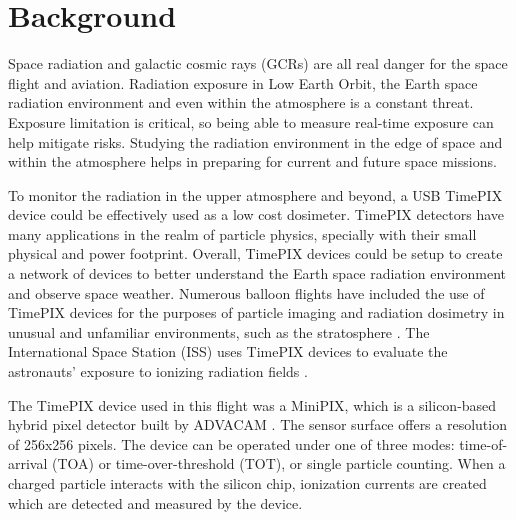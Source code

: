 %
%
%
\section{Background}
\label{Background}
Space radiation and galactic cosmic rays (GCRs) are all real danger for the space flight and aviation.  Radiation exposure in Low Earth Orbit, the Earth space radiation environment and even within the atmosphere is a constant threat. Exposure limitation is critical, so being able to measure real-time exposure can help mitigate risks.  Studying the radiation environment in the edge of space and within the atmosphere helps in preparing for current and future space missions.  

To monitor the radiation in the upper atmosphere and beyond, a USB TimePIX device could be effectively used as a low cost dosimeter.  TimePIX detectors have many applications in the realm of particle physics, specially with their small physical and power footprint. Overall, TimePIX devices could be setup to create a network of devices to better understand the Earth space radiation environment and observe space weather.
%
%
%
%
Numerous balloon flights have included the use of TimePIX devices for the purposes of particle imaging and radiation dosimetry in unusual and unfamiliar environments, such as the stratosphere \cite{bexus}. 
%
The International Space Station (ISS) uses TimePIX devices to evaluate the astronauts' exposure to ionizing radiation fields \cite{timepix}.

The TimePIX device used in this flight was a MiniPIX, which is a silicon-based hybrid pixel detector built by ADVACAM \cite{advacam}. 
%
The sensor surface offers a resolution of 256x256 pixels.
%
The device can be operated under one of three modes: time-of-arrival (TOA) or time-over-threshold (TOT), or single particle counting. 
%
When a charged particle interacts with the silicon chip, ionization currents are created which are detected and measured by the device.

